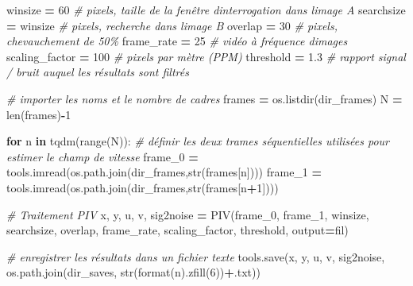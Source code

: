 \documentclass[
]{article}
\newenvironment{Shaded}{\begin{snugshade}}{\end{snugshade}}
\newcommand{\BuiltInTok}[1]{#1}
\newcommand{\CommentTok}[1]{\textcolor[rgb]{0.56,0.35,0.01}{\textit{#1}}}
\newcommand{\ControlFlowTok}[1]{\textcolor[rgb]{0.13,0.29,0.53}{\textbf{#1}}}
\newcommand{\DecValTok}[1]{\textcolor[rgb]{0.00,0.00,0.81}{#1}}
\newcommand{\FloatTok}[1]{\textcolor[rgb]{0.00,0.00,0.81}{#1}}
\newcommand{\KeywordTok}[1]{\textcolor[rgb]{0.13,0.29,0.53}{\textbf{#1}}}
\newcommand{\NormalTok}[1]{#1}
\newcommand{\OperatorTok}[1]{\textcolor[rgb]{0.81,0.36,0.00}{\textbf{#1}}}
\newcommand{\StringTok}[1]{\textcolor[rgb]{0.31,0.60,0.02}{#1}}
\begin{document}
\begin{Shaded}
\begin{Highlighting}[]
\NormalTok{winsize }\OperatorTok{=}  \DecValTok{60}            \CommentTok{\# pixels, taille de la fenêtre d\textquotesingle{}interrogation dans l\textquotesingle{}image A}
\NormalTok{searchsize }\OperatorTok{=}\NormalTok{ winsize     }\CommentTok{\# pixels, recherche dans l\textquotesingle{}image B}
\NormalTok{overlap }\OperatorTok{=}  \DecValTok{30}            \CommentTok{\# pixels, chevauchement de 50\%}
\NormalTok{frame\_rate }\OperatorTok{=} \DecValTok{25}          \CommentTok{\# vidéo à fréquence d\textquotesingle{}images}
\NormalTok{scaling\_factor }\OperatorTok{=} \DecValTok{100}     \CommentTok{\# pixels par mètre (PPM)}
\NormalTok{threshold }\OperatorTok{=} \FloatTok{1.3}          \CommentTok{\# rapport signal / bruit auquel les résultats sont filtrés}
\end{Highlighting}
\end{Shaded}

\begin{Shaded}
\begin{Highlighting}[]
\CommentTok{\# importer les noms et le nombre de cadres}
\NormalTok{frames }\OperatorTok{=}\NormalTok{ os.listdir(dir\_frames)}
\NormalTok{N }\OperatorTok{=} \BuiltInTok{len}\NormalTok{(frames)}\OperatorTok{{-}}\DecValTok{1}

\ControlFlowTok{for}\NormalTok{ n }\KeywordTok{in}\NormalTok{ tqdm(}\BuiltInTok{range}\NormalTok{(N)):}
    \CommentTok{\# définir les deux trames séquentielles utilisées pour estimer le champ de vitesse}
\NormalTok{    frame\_0 }\OperatorTok{=}\NormalTok{ tools.imread(os.path.join(dir\_frames,}\BuiltInTok{str}\NormalTok{(frames[n])))}
\NormalTok{    frame\_1 }\OperatorTok{=}\NormalTok{ tools.imread(os.path.join(dir\_frames,}\BuiltInTok{str}\NormalTok{(frames[n}\OperatorTok{+}\DecValTok{1}\NormalTok{])))}

    \CommentTok{\# Traitement PIV}
\NormalTok{    x, y, u, v, sig2noise }\OperatorTok{=}\NormalTok{ PIV(frame\_0, frame\_1, winsize, searchsize,}
\NormalTok{                                overlap, frame\_rate, scaling\_factor,}
\NormalTok{                                threshold, output}\OperatorTok{=}\StringTok{\textquotesingle{}fil\textquotesingle{}}\NormalTok{)}

    \CommentTok{\# enregistrer les résultats dans un fichier texte}
\NormalTok{    tools.save(x,}
\NormalTok{               y,}
\NormalTok{               u,}
\NormalTok{               v,}
\NormalTok{               sig2noise,}
\NormalTok{               os.path.join(dir\_saves, }\BuiltInTok{str}\NormalTok{(}\BuiltInTok{format}\NormalTok{(n).zfill(}\DecValTok{6}\NormalTok{))}\OperatorTok{+}\StringTok{\textquotesingle{}.txt\textquotesingle{}}\NormalTok{))}
\end{Highlighting}
\end{Shaded}
\end{document}
